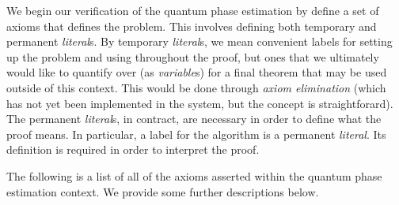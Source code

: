 \documentclass{article}[12pt]
\begin{document}
We begin our verification of the quantum phase estimation by define a set of axioms that defines the problem.  This involves defining both temporary and permanent {\em literal}s.  By temporary {\em literal}s, we mean convenient labels for setting up the problem and using throughout the proof, but ones that we ultimately would like to quantify over (as {\em variable}s) for a final theorem that may be used outside of this context.  This would be done through {\em axiom elimination} (which has not yet been implemented in the system, but the concept is straightforard).  The permanent {\em literal}s, in contract, are necessary in order to define what the proof means.  In particular, a label for the algorithm is a permanent {\em literal}.  Its definition is required in order to interpret the proof.

The following is a list of all of the axioms asserted within the quantum phase estimation context.  We provide some further descriptions below.
\end{document}
